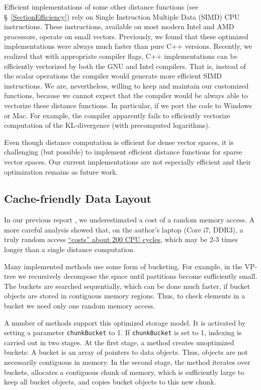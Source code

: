 \documentclass[runningheads,a4paper]{llncs}
\newcommand{\ttt}[1]{\texttt{#1}}
\begin{document}
{Efficient implementations of some other distance functions (see \S~\ref{SectionEfficiency})
rely on Single Instruction Multiple Data (SIMD) CPU instructions. 
These instructions, available on most modern Intel and AMD processors, 
operate on small vectors. 
Previously, we found that these optimized implementations were always
much faster than pure C++ versions.
Recently, we realized that with appropriate compiler flags,
C++ implementations can be efficiently vectorized by both the GNU and Intel compilers.
That is, instead of the scalar operations the compiler would generate
more efficient SIMD instructions.
We are, nevertheless, willing to keep and maintain our customized functions,
because we cannot expect that the compiler would be always able to vectorize
 these distance functions. 
In particular, if we port the code to Windows or Mac.
For example, the compiler apparently fails to efficiently vectorize 
computation of the KL-divergence (with precomputed logarithms).

Even though distance computation is efficient for dense vector spaces,
it is challenging (but possible) 
to implement efficient distance functions for sparse vector spaces.
Our current implementations are not especially efficient and their optimization
remains as future work.

\subsection{Cache-friendly Data Layout}
In our previous report \cite{Boytsov_and_Bilegsaikhan:sisap2013},
we underestimated a cost of a random memory access.
A more careful analysis showed that, 
on the author's laptop (Core i7, DDR3), 
a truly random access \href{http://searchivarius.org/blog/main-memory-similar-hard-drive}{``costs'' about 200 CPU cycles},
which may be 2-3 times longer than a single distance computation.

Many implemented methods use some form of bucketing.
For example, in the VP-tree we recursively decompose the space
until partitions become sufficiently small.
The buckets are searched sequentially,
which can be done much faster, if bucket objects are stored
in contiguous memory regions.
Thus, to check elements in a bucket we need only one random memory access.

A number of methods support this optimized storage model.
It is activated by setting a parameter \ttt{chunkBucket} to 1.
If \ttt{chunkBucket} is set to 1, indexing is carried out in two stages.
At the first stage, a method creates unoptimized buckets:
A bucket is an array of pointers to data objects.
Thus, objects are not necessarily contiguous in memory.
In the second stage, the method iterates over buckets,
allocates a contiguous chunk of memory,
which is sufficiently large to keep all bucket objects,
and copies bucket objects to this new chunk.

}
\end{document}
